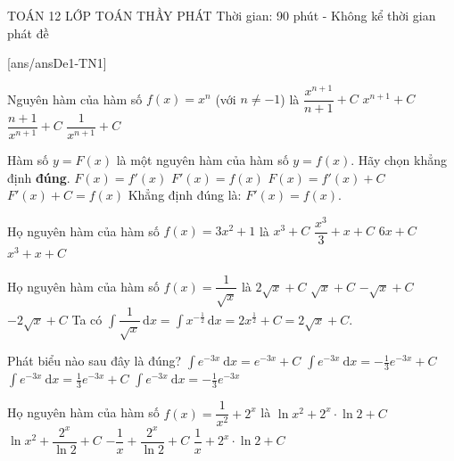 \begin{name}
	{\tenchude}
	{TOÁN 12}
	{LỚP TOÁN THẦY PHÁT}
	{Thời gian: 90 phút - Không kể thời gian phát đề}
\end{name}
\TN
{}[ans/ansDe1-TN1]
\begin{ex}%
	Nguyên hàm của hàm số $f(x)=x^n$ (với $n\neq -1$) là
	\choice
	{\True $\dfrac{x^{n+1}}{n+1}+C$}
	{$x^{n+1}+C$}
	{$\dfrac{n+1}{x^{n+1}}+C$}
	{$\dfrac{1}{x^{n+1}}+C$}
\end{ex}

\begin{ex}%
	Hàm số $y=F(x)$ là một nguyên hàm của hàm số $y=f(x)$. Hãy chọn khẳng định \textbf{đúng}.
	\choice
	{$F(x)=f'(x)$}
	{\True $F'(x)=f(x)$}
	{$F(x)=f'(x)+C$}
	{$F'(x)+C=f(x)$}
	\loigiai
	{
		Khẳng định đúng là: $F'(x)=f(x)$.
	}
\end{ex}

\begin{ex}%
	Họ nguyên hàm của hàm số $f(x)=3x^2+1$ là
	\choice
	{$x^3+C$}
	{$\dfrac{x^3}{3}+x+C$}
	{$6x+C$}
	{\True $x^3+x+C$}
\end{ex}

\begin{ex}%
	Họ nguyên hàm của hàm số $f(x)= \dfrac{1}{\sqrt{x}} $ là
	\choice
	{\True $2\sqrt{x}+C$}
	{$\sqrt{x} + C$}
	{$- \sqrt{x} +C$}
	{$-2\sqrt{x}+C$}
	\loigiai
	{
	Ta có $\displaystyle \int\dfrac{1}{\sqrt{x}}\mathrm{\,d}x=\int x^{-\tfrac{1}{2}}\mathrm{\,d}x=2x^{\tfrac{1}{2}}+C=2\sqrt{x}+C$.
	}
\end{ex}

\begin{ex}%
	Phát biểu nào sau đây là đúng?
	\choice
	{$\displaystyle\int e^{-3 x} \mathrm{~d} x=e^{-3 x}+C$}
	{\True $\displaystyle\int e^{-3 x} \mathrm{~d} x=-\frac{1}{3} e^{-3 x}+C$}
	{$\displaystyle\int e^{-3 x} \mathrm{~d} x=\frac{1}{3} e^{-3 x}+C$}
	{$\displaystyle\int e^{-3 x} \mathrm{~d} x=-\frac{1}{3} e^{-3 x}$}
\end{ex}

\begin{ex}%
	Họ nguyên hàm của hàm số $f(x)=\dfrac{1}{x^2}+2^x$ là
	\choice
	{$\ln x^2+2^x \cdot \ln 2+C$}
	{$\ln x^2+\dfrac{2^x}{\ln 2}+C$}
	{\True $-\dfrac{1}{x}+\dfrac{2^x}{\ln 2}+C$}
	{$\dfrac{1}{x}+2^x \cdot \ln 2+C$}
\end{ex}

